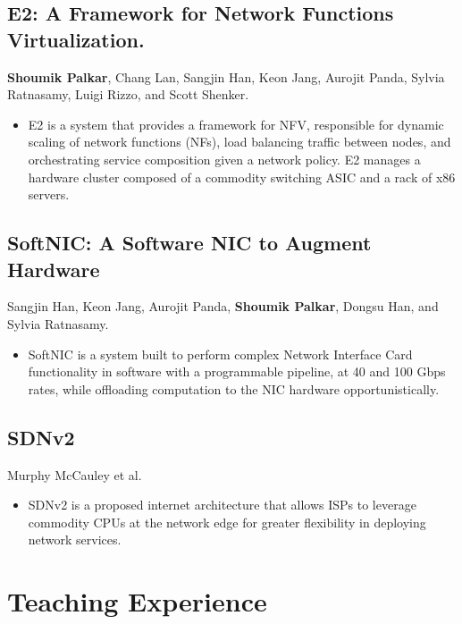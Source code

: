 \documentclass[11pt,letterpaper,sans]{moderncv}
\begin{document}
\subsection{E2: A Framework for Network Functions Virtualization.}
\cvitem {}
{
    \textbf{Shoumik Palkar}, Chang Lan, Sangjin Han, Keon Jang, Aurojit Panda, Sylvia Ratnasamy,
    Luigi Rizzo, and Scott Shenker.
    \begin{itemize}
        \item E2 is a system that provides a framework for NFV, responsible for dynamic scaling
        of network functions (NFs), load balancing traffic between nodes, and orchestrating
        service composition given a network policy. E2 manages a hardware cluster composed of a
        commodity switching ASIC and a rack of x86 servers.
    \end{itemize}
}

\subsection{SoftNIC: A Software NIC to Augment Hardware}
\cvitem{}
{
    Sangjin Han, Keon Jang, Aurojit Panda, \textbf{Shoumik Palkar}, Dongsu Han, and Sylvia Ratnasamy.
    \begin{itemize}
        \item SoftNIC is a system built to perform complex Network Interface Card functionality in
        software with a programmable pipeline, at 40 and 100 Gbps rates, while offloading
        computation to the NIC hardware opportunistically.
    \end{itemize}
}

\subsection{SDNv2}
\cvitem{} 
{
    Murphy McCauley et al.
    \begin{itemize}
        \item SDNv2 is a proposed internet architecture that allows ISPs to leverage commodity CPUs
        at the network edge for greater flexibility in deploying network services.
    \end{itemize}
}

\section{Teaching Experience}

 {}
\end{document}
